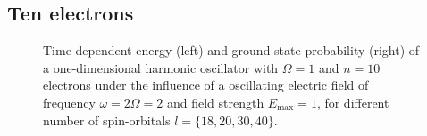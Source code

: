 \vfill
\pagebreak

\subsection*{Ten electrons}

\begin{figure}[!h]
    \centering
    \caption{Time-dependent energy (left) and ground state probability (right)
        of a one-dimensional harmonic oscillator with $\Omega=1$
        and $n=10$ electrons under the influence of a oscillating electric field 
        of frequency $\omega = 2 \Omega = 2$ and field strength $E_\text{max}=1$,
        for different number of spin-orbitals $l=\{18,20,30,40\}$.
    }
    \label{fig:1d_n10_qd}
\end{figure}

